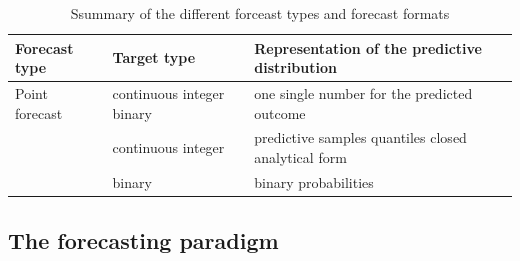 \documentclass[article,shortnames]{jss}
\begin{document}
\begin{table}[h!]
\centering
\begin{longtable}[t]{>{\raggedright\arraybackslash}p{3.5cm}>{\raggedright\arraybackslash}p{2.5cm}>{\raggedright\arraybackslash}p{4.5cm}}
\toprule
\textbf{Forecast type} & \textbf{Target type} & \textbf{Representation of the predictive distribution}\\
\midrule
Point forecast & continuous \newline  integer \newline  binary & one single number for the predicted outcome\\
\cmidrule{1-3}\pagebreak[0]
 & continuous \newline  integer & predictive samples \newline   quantiles \newline   closed analytical form\\
\cmidrule{2-3}\nopagebreak
\multirow{-2}{3.5cm}{\raggedright\arraybackslash Probabilistic forecast} & binary & binary probabilities\\
\bottomrule
\end{longtable}\caption{\label{tab:forecast-types} Ssummary of the different forceast types and forecast formats}
\end{table}


\subsection{The forecasting paradigm}
\end{document}
